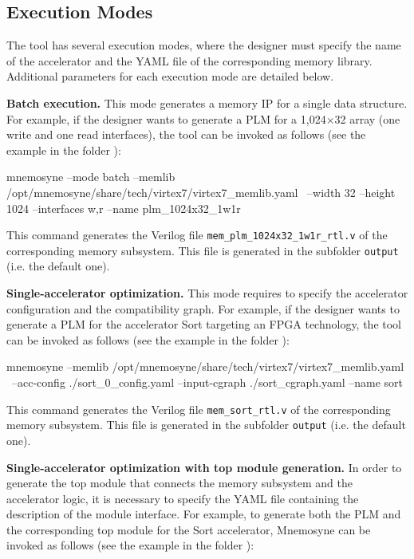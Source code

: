 \subsection{Execution Modes}

The tool has several execution modes, where the designer must specify the
name of the accelerator and the YAML file of
the corresponding memory library. Additional parameters for each execution mode
are detailed below.

\vspace{4pt}
{\bf Batch execution.} This mode generates a memory IP for a single data structure. For example,
if the designer wants to generate a PLM for a 1,024$\times$32 array (one write and one read interfaces), the tool can be invoked as 
follows (see the example in the folder ):

\begin{commandshell}{}
  mnemosyne --mode batch --memlib /opt/mnemosyne/share/tech/virtex7/virtex7_memlib.yaml  \                 --width 32 --height 1024 --interfaces w,r --name plm_1024x32_1w1r
\end{commandshell}

\noindent This command generates the Verilog file {\tt mem\_plm\_1024x32\_1w1r\_rtl.v} of the corresponding memory subsystem. This file is generated in the subfolder {\tt output} (i.e. the default one).

\vspace{4pt}
{\bf Single-accelerator optimization.} This mode requires to specify
the accelerator configuration and the compatibility graph. For
example, if the designer wants to generate a PLM for the
accelerator {\sc Sort} targeting an FPGA technology, the tool can be
invoked as follows (see the example in the folder ):

\begin{commandshell}{}
  mnemosyne --memlib /opt/mnemosyne/share/tech/virtex7/virtex7_memlib.yaml  \                 --acc-config ./sort_0_config.yaml --input-cgraph ./sort_cgraph.yaml --name sort
\end{commandshell}

\noindent This command generates the Verilog file {\tt mem\_sort\_rtl.v} of the corresponding memory subsystem. This file is generated in the subfolder {\tt output} (i.e. the default one).

\vspace{4pt}
{\bf Single-accelerator optimization with top module generation.} In order to
generate the top module that connects the memory subsystem and the accelerator
logic, it is necessary to specify the YAML file containing the description of the
module interface. For example, to generate both the PLM and the
corresponding top module for the {\sc Sort} accelerator, {\sc Mnemosyne} can be
invoked as follows (see the example in the folder ):

